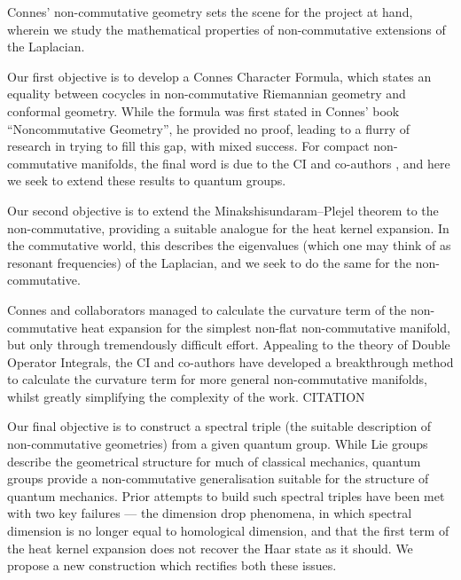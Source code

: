 \documentclass[12pt]{article}
\begin{document}
Connes' non-commutative geometry sets the scene for the project at hand,
wherein we study the mathematical properties of non-commutative extensions of
the Laplacian.

Our first objective is to develop a Connes Character Formula, which states
an equality between cocycles in non-commutative Riemannian geometry and
conformal geometry.
While the formula was first stated in Connes' book ``Noncommutative Geometry'',
he provided no proof, leading to a flurry of research in trying to fill this
gap, with mixed success.
For compact non-commutative manifolds, the final word is due to the CI and
co-authors \cite{CRSZ}, and here we seek to extend these results to quantum
groups.


Our second objective is to extend the Minakshisundaram--Plejel theorem to the
non-commutative, providing a suitable analogue for the heat kernel expansion.
In the commutative world, this describes the eigenvalues (which one may think of
as resonant frequencies) of the Laplacian, and we seek to do the same for the
non-commutative.

Connes and collaborators managed to calculate the curvature term of the
non-commutative heat expansion for the simplest non-flat non-commutative
manifold, but only through tremendously difficult effort.
Appealing to the theory of Double Operator Integrals, the CI and co-authors
have developed a breakthrough method to calculate the curvature term for more
general non-commutative manifolds, whilst greatly simplifying the complexity of
the work. {\color{red} CITATION}

Our final objective is to construct a spectral triple (the suitable description
of non-commutative geometries) from a given quantum group.
While Lie groups describe the geometrical structure for much of classical
mechanics, quantum groups provide a non-commutative generalisation suitable
for the structure of quantum mechanics.
Prior attempts to build such spectral triples have been met with two key failures
---
the dimension drop phenomena, in which spectral dimension is no longer equal
to homological dimension, and that the first term of the heat kernel expansion
does not recover the Haar state as it should.
We propose a new construction which rectifies both these issues.
\end{document}
